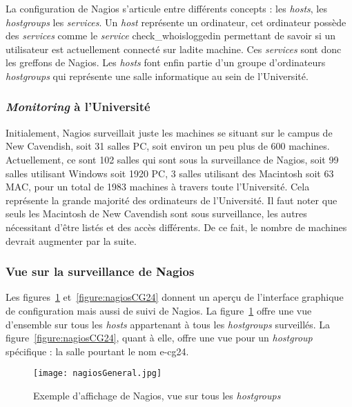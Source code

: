La configuration de Nagios s'articule entre diff\'erents concepts : les \textit{hosts}, les \textit{hostgroups} les \textit{services}.
Un \textit{host} repr\'esente un ordinateur, cet ordinateur poss\`ede des \textit{services} comme le \textit{service} \textsf{check\_whoisloggedin} permettant de savoir si un utilisateur est actuellement connect\'e sur ladite machine. 
Ces \textit{services} sont donc les greffons de Nagios.
Les \textit{hosts} font enfin partie d'un groupe d'ordinateurs \textit{hostgroups} qui repr\'esente une salle informatique au sein de l'Universit\'e.

\subsubsection{\og{}\textit{Monitoring}\fg{} \`a l'Universit\'e}

Initialement, Nagios surveillait juste les machines se situant sur le campus de New Cavendish, soit 31 salles PC, soit environ un peu plus de 600 machines.
Actuellement, ce sont 102 salles qui sont sous la surveillance de Nagios, soit 99 salles utilisant Windows soit 1920 PC, 3 salles utilisant des Macintosh soit 63 MAC, pour un total de 1983 machines \`a travers toute l'Universit\'e. Cela repr\'esente la grande majorit\'e des ordinateurs de l'Universit\'e.
Il faut noter que seuls les Macintosh de New Cavendish sont sous surveillance, les autres n\'ecessitant d'\^etre list\'es et des acc\`es diff\'erents.
De ce fait, le nombre de machines devrait augmenter par la suite.

\subsubsection{Vue sur la surveillance de Nagios}

Les figures~\ref{figure:nagiosGeneral} et~\ref{figure:nagiosCG24}  donnent un aper\c{c}u de l'interface graphique de configuration mais aussi de suivi de Nagios.
La figure~\ref{figure:nagiosGeneral} offre une vue d'ensemble sur tous les \textit{hosts} appartenant \`a tous les \textit{hostgroups} surveill\'es.
La figure~\ref{figure:nagiosCG24}, quant \`a elle, offre une vue pour un \textit{hostgroup} sp\'ecifique : la salle pourtant le nom \textsf{e-cg24}.

\clearpage

\begin{figure}[!ht]
	\centering
	\texttt{[image: nagiosGeneral.jpg]}
	\caption{Exemple d'affichage de Nagios, vue sur tous les \textit{hostgroups}}
	\label{figure:nagiosGeneral}
	
\end{figure}

